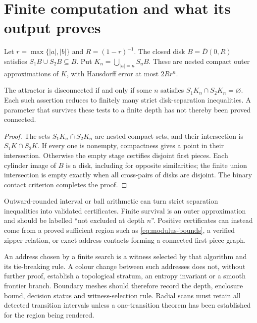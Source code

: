 \section{Finite computation and what its output proves}
\label{sec:core-computation}

Let $r=\max\{|a|,|b|\}$ and $R=(1-r)^{-1}$. The closed disk
$B=\overline{D}(0,R)$ satisfies $S_1B\cup S_2B\subseteq B$.
Put $K_n=\bigcup_{|u|=n}S_uB$. These are nested compact outer
approximations of $K$, with Hausdorff error at most $2Rr^n$.

\begin{proposition}
\label{prop:finite-exclusion}
The attractor is disconnected if and only if some $n$ satisfies
$S_1K_n\cap S_2K_n=\varnothing$. Each such assertion reduces to
finitely many strict disk-separation inequalities. A parameter
that survives these tests to a finite depth has not thereby been
proved connected.
\end{proposition}
\begin{proof}
The sets $S_1K_n\cap S_2K_n$ are nested compact sets, and their
intersection is $S_1K\cap S_2K$. If every one is nonempty, compactness
gives a point in their intersection. Otherwise the empty stage
certifies disjoint first pieces. Each cylinder image of $B$ is a
disk, including for opposite similarities; the finite union
intersection is empty exactly when all cross-pairs of disks are
disjoint. The binary contact criterion completes the proof.
\end{proof}

Outward-rounded interval or ball arithmetic can turn strict
separation inequalities into validated certificates. Finite
survival is an outer approximation and should be labelled
``not excluded at depth $n$''. Positive certificates can instead
come from a proved sufficient region such as
\eqref{eq:modulus-bounds}, a verified zipper relation, or exact
address contacts forming a connected first-piece graph.



An address chosen by a finite search is a witness selected by that
algorithm and its tie-breaking rule. A colour change between such
addresses does not, without further proof, establish a topological
stratum, an entropy invariant or a smooth frontier branch. Boundary
meshes should therefore record the depth, enclosure bound, decision
status and witness-selection rule. Radial scans must retain all
detected transition intervals unless a one-transition theorem has
been established for the region being rendered.

